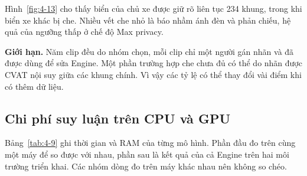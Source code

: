 Hình~\ref{fig:4-13} cho thấy biển của chủ xe được giữ rõ liên tục 234 khung, trong khi biển xe khác bị che. Nhiều vết che nhỏ là báo nhầm ánh đèn và phản chiếu, hệ quả của ngưỡng thấp ở chế độ Max privacy.

\textbf{Giới hạn.} Năm clip đều do nhóm chọn, mỗi clip chỉ một người gán nhãn và đã được dùng để sửa Engine. Một phần trường hợp che chưa đủ có thể do nhãn được CVAT nội suy giữa các khung chính. Vì vậy các tỷ lệ có thể thay đổi vài điểm khi có thêm dữ liệu.

\subsection{Chi phí suy luận trên CPU và GPU}

Bảng~\ref{tab:4-9} ghi thời gian và RAM của từng mô hình. Phần đầu đo trên cùng một máy để so được với nhau, phần sau là kết quả của cả Engine trên hai môi trường triển khai. Các nhóm dòng đo trên máy khác nhau nên không so chéo.

